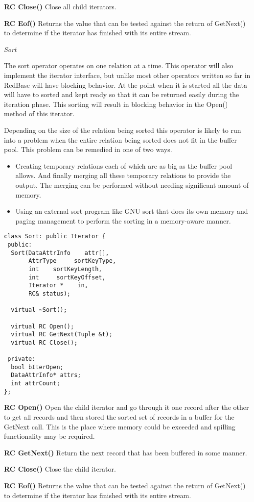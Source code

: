 \documentclass[letterpaper,11pt]{article}
\newcommand{\resitem}[1]{\item #1 \vspace{-2pt}}
\newcommand{\resheading}[1]{{\vspace{0.1in}\large {\textbf{\textsf{#1 \vphantom{p\^{E}}}}}}}
\begin{document}
  \resheading{RC Close()}
Close all child iterators.

  \resheading{RC Eof()}
Returns the value that can be tested against the return of GetNext() to
determine if the iterator has finished with its entire stream.

\resheading{}
\emph{Sort}
\resheading{}

The sort operator operates on one relation at a time. This operator will also
implement the iterator interface, but unlike most other operators written so far
in RedBase will have blocking behavior. At the point when it is started all the
data will have to sorted and kept ready so that it can be returned easily during
the iteration phase. This sorting will result in blocking behavior in the Open()
method of this iterator.

Depending on the size of the relation being sorted this operator is likely to
run into a problem when the entire relation being sorted does not fit in the
buffer pool. This problem can be remedied in one of two ways.

  \begin{itemize}

    \resitem{Creating temporary relations each of which are as big as the buffer
    pool allows. And finally merging all these temporary relations to provide the
  output. The merging can be performed without needing significant amount of
  memory.}

    \resitem{Using an external sort program like GNU sort that does its own
      memory and paging management to perform the sorting in a memory-aware
      manner.}

  \end{itemize}




\begin{verbatim}
class Sort: public Iterator {
 public:
  Sort(DataAttrInfo    attr[],
       AttrType     sortKeyType,
       int    sortKeyLength,
       int     sortKeyOffset,
       Iterator *    in,
       RC& status);

  virtual ~Sort();

  virtual RC Open();
  virtual RC GetNext(Tuple &t);
  virtual RC Close();
  
 private:
  bool bIterOpen;
  DataAttrInfo* attrs;
  int attrCount;
};
\end{verbatim}

  \resheading{RC Open()}
Open the child iterator and go through it one record after the other to get all
records and then stored the sorted set of records in a buffer for the GetNext
call. This is the place where memory could be exceeded and spilling
functionality may be required.

  \resheading{RC GetNext()}
Return the next record that has been buffered in some manner.

  \resheading{RC Close()}
Close the child iterator.

  \resheading{RC Eof()}
Returns the value that can be tested against the return of GetNext() to
determine if the iterator has finished with its entire stream.
\end{document}
